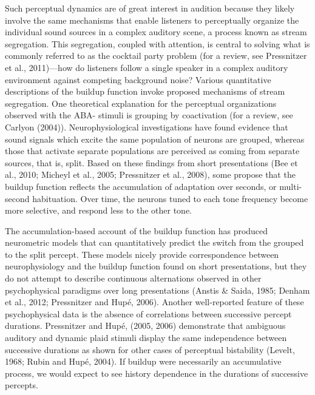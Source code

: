 Such perceptual dynamics are of great interest in audition because they likely involve the same mechanisms that enable listeners to perceptually organize the individual sound sources in a complex auditory scene, a process known as stream segregation. This segregation, coupled with attention,  
is central to solving what is commonly referred to as the cocktail party problem (for a review, see Pressnitzer et al., 2011)---how do listeners follow a single speaker in a complex auditory environment against competing background noise? Various quantitative descriptions of the buildup function invoke proposed mechanisms of stream segregation. One theoretical explanation for the perceptual organizations observed with the ABA- stimuli is grouping by coactivation (for a review, see Carlyon (2004)). Neurophysiological investigations have found evidence that sound signals which excite the same population of neurons are grouped, whereas those that activate separate populations are perceived as coming from separate sources, that is, split. Based on these findings from short presentations (Bee et al., 2010; Micheyl et al., 2005; Pressnitzer et al., 2008), some propose that the buildup function reflects the accumulation of adaptation over seconds, or multi-second habituation. Over time, the neurons tuned to each tone frequency become more selective, and respond less to the other tone. 

The accumulation-based account of the buildup function has produced neurometric models that can quantitatively predict the switch from the grouped to the split percept. These models nicely provide correspondence between neurophysiology and the buildup function found on short presentations, but they do not attempt to describe continuous alternations observed in other psychophysical paradigms over long presentations (Anstis \& Saida, 1985; Denham et al., 2012; Pressnitzer and Hupé, 2006). Another well-reported feature of these psychophysical data is the absence of correlations between successive percept durations. Pressnitzer and Hupé, (2005, 2006) demonstrate that ambiguous auditory and dynamic plaid stimuli display the same independence between successive durations as shown for other cases of perceptual bistability (Levelt, 1968; Rubin and Hupé, 2004). If buildup were necessarily an accumulative process, we would expect to see history dependence in the durations of successive percepts. 

